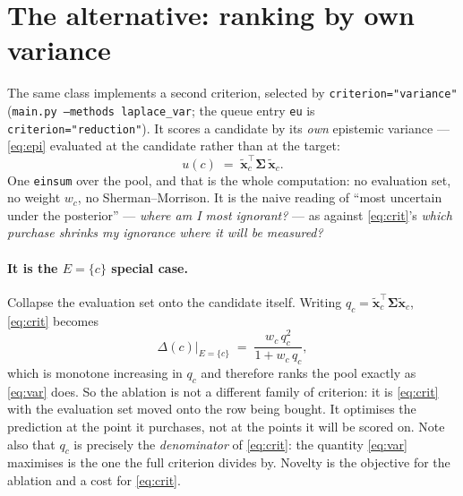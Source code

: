 \documentclass[11pt]{article}
\newcommand{\bx}{\bm{x}}
\newcommand{\bS}{\bm{\Sigma}}
\begin{document}
\section{The alternative: ranking by own variance}
\label{sec:var}

The same class implements a second criterion, selected by \texttt{criterion="variance"}
(\texttt{main.py --methods laplace\_var}; the queue entry \texttt{eu} is
\texttt{criterion="reduction"}). It scores a candidate by its \emph{own}
epistemic variance --- \eqref{eq:epi} evaluated at the candidate rather than at the target:
\begin{equation}
  u(c) \;=\; \tilde{\bx}_c^{\!\top}\bS\,\tilde{\bx}_c .
  \label{eq:var}
\end{equation}
One \texttt{einsum} over the pool, and that is the whole computation: no evaluation set, no
weight $w_c$, no Sherman--Morrison. It is the naive reading of ``most uncertain under the
posterior'' --- \emph{where am I most ignorant?} --- as against \eqref{eq:crit}'s \emph{which
purchase shrinks my ignorance where it will be measured?}

\paragraph{It is the $E=\{c\}$ special case.} Collapse the evaluation set onto the candidate
itself. Writing $q_c = \tilde{\bx}_c^{\!\top}\bS\tilde{\bx}_c$, \eqref{eq:crit} becomes
\begin{equation}
  \Delta(c)\Big|_{E=\{c\}} \;=\; \frac{w_c\,q_c^{2}}{1 + w_c\,q_c},
  \label{eq:collapse}
\end{equation}
which is monotone increasing in $q_c$ and therefore ranks the pool exactly as \eqref{eq:var}
does. So the ablation is not a different family of criterion: it is \eqref{eq:crit} with the
evaluation set moved onto the row being bought. It optimises the prediction at the point it
purchases, not at the points it will be scored on. Note also that $q_c$ is precisely the
\emph{denominator} of \eqref{eq:crit}: the quantity \eqref{eq:var} maximises is the one the full
criterion divides by. Novelty is the objective for the ablation and a cost for \eqref{eq:crit}.
\end{document}
